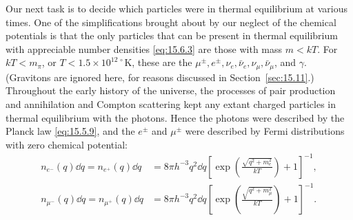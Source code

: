 Our next task is to decide which particles were in thermal equilibrium at
various times. One of the simplifications brought about by our neglect of the
chemical potentials is that the only particles that can be present in thermal
equilibrium with appreciable number densities \eqref{eq:15.6.3} are those with
mass \(m<kT\). For \(kT<m_\pi\), or
\(T<1.5\times10^{12\,\circ}\mathrm K\), these are the
\(\mu^\pm,e^\pm,\nu_e,\bar\nu_e,\nu_\mu,\bar\nu_\mu\), and \(\gamma\).
(Gravitons are ignored here, for reasons discussed in
Section~\ref{sec:15.11}.) Throughout the early history of the universe, the
processes of pair production and annihilation and Compton scattering kept any
extant charged particles in thermal equilibrium with the photons. Hence the
photons were described by the Planck law \eqref{eq:15.5.9}, and the \(e^\pm\)
and \(\mu^\pm\) were described by Fermi distributions with zero chemical
potential:
\begin{align}
  n_{e^-}(q)\dd q
  =
  n_{e^+}(q)\dd q
  &=
  8\pi h^{-3}q^2\dd q
  \left[
    \exp\left(\frac{\sqrt{q^2+m_e^2}}{kT}\right)+1
  \right]^{-1},
  \tag{15.6.18}\label{eq:15.6.18}\\
  n_{\mu^-}(q)\dd q
  =
  n_{\mu^+}(q)\dd q
  &=
  8\pi h^{-3}q^2\dd q
  \left[
    \exp\left(\frac{\sqrt{q^2+m_\mu^2}}{kT}\right)+1
  \right]^{-1}.
  \tag{15.6.19}\label{eq:15.6.19}
\end{align}

